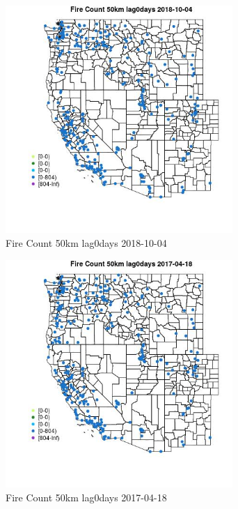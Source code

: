 \begin{figure} 
\centering  
\includegraphics[width=0.77\textwidth]{Code_Outputs/Report_ML_input_PM25_Step4_part_f_de_duplicated_aves_prioritize_24hr_obswNAs_MapObsFire_Count_50km_lag0days2018-10-04.jpg} 
\caption{\label{fig:Report_ML_input_PM25_Step4_part_f_de_duplicated_aves_prioritize_24hr_obswNAsMapObsFire_Count_50km_lag0days2018-10-04}Fire Count 50km lag0days 2018-10-04} 
\end{figure} 
 

\begin{figure} 
\centering  
\includegraphics[width=0.77\textwidth]{Code_Outputs/Report_ML_input_PM25_Step4_part_f_de_duplicated_aves_prioritize_24hr_obswNAs_MapObsFire_Count_50km_lag0days2017-04-18.jpg} 
\caption{\label{fig:Report_ML_input_PM25_Step4_part_f_de_duplicated_aves_prioritize_24hr_obswNAsMapObsFire_Count_50km_lag0days2017-04-18}Fire Count 50km lag0days 2017-04-18} 
\end{figure} 
 

